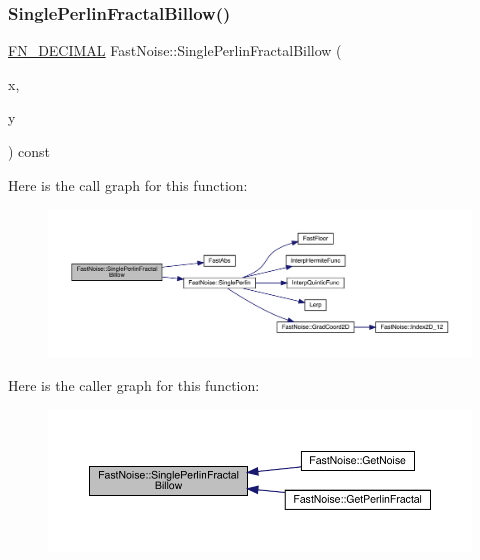 \subsubsection{\texorpdfstring{Single\+Perlin\+Fractal\+Billow()}{SinglePerlinFractalBillow()}\hspace{0.1cm}{\footnotesize\ttfamily [1/2]}}
{\footnotesize\ttfamily \mbox{\hyperlink{_fast_noise_8h_a75a9ef6d2541c4921815b885bfd449c3}{F\+N\+\_\+\+D\+E\+C\+I\+M\+AL}} Fast\+Noise\+::\+Single\+Perlin\+Fractal\+Billow (\begin{DoxyParamCaption}\item[{\mbox{\hyperlink{_fast_noise_8h_a75a9ef6d2541c4921815b885bfd449c3}{F\+N\+\_\+\+D\+E\+C\+I\+M\+AL}}}]{x,  }\item[{\mbox{\hyperlink{_fast_noise_8h_a75a9ef6d2541c4921815b885bfd449c3}{F\+N\+\_\+\+D\+E\+C\+I\+M\+AL}}}]{y }\end{DoxyParamCaption}) const\hspace{0.3cm}{\ttfamily [private]}}

Here is the call graph for this function\+:
\nopagebreak
\begin{figure}[H]
\begin{center}
\leavevmode
\includegraphics[width=350pt]{class_fast_noise_a7de7c8fe23437c93cc139193e48f3079_cgraph}
\end{center}
\end{figure}
Here is the caller graph for this function\+:
\nopagebreak
\begin{figure}[H]
\begin{center}
\leavevmode
\includegraphics[width=350pt]{class_fast_noise_a7de7c8fe23437c93cc139193e48f3079_icgraph}
\end{center}
\end{figure}
\mbox{\label{class_fast_noise_a4e99adf451ddbd11a425a0909b2ae7e1}} 
